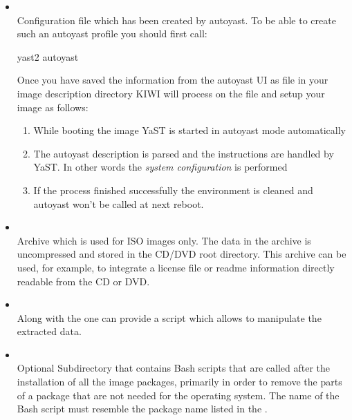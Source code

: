 \begin{itemize}
\item {}\\
      Configuration file which has been created by autoyast.
      To be able to create such an autoyast profile you should first
      call:

\begin{Command}{8cm}
yast2 autoyast
\end{Command}

      Once you have saved the information from the autoyast UI as
       file in your image description directory KIWI
      will process on the file and setup your image as follows:
      \begin{enumerate}
      \item While booting the image YaST is started in autoyast mode
            automatically
      \item The autoyast description is parsed and the instructions are
            handled by YaST. In other words the \emph{system configuration}
            is performed
      \item If the process finished successfully the environment is
            cleaned and autoyast won't be called at next reboot.
      \end{enumerate}

\item {}\\
      Archive which is used for ISO images only. The data in the archive is
      uncompressed and stored in the CD/DVD root directory. This
      archive can be used, for example, to integrate a license file or
      readme information directly readable from the CD or DVD.

\item {}\\
      Along with the  one can provide a script which allows
      to manipulate the extracted data.

\item {}\\
      Optional Subdirectory that contains Bash scripts that are called
      after the installation of all the image packages, primarily in order
      to remove the parts of a package that are not needed for the operating
      system. The name of the Bash script must resemble the package name
      listed in the .
\end{itemize}

